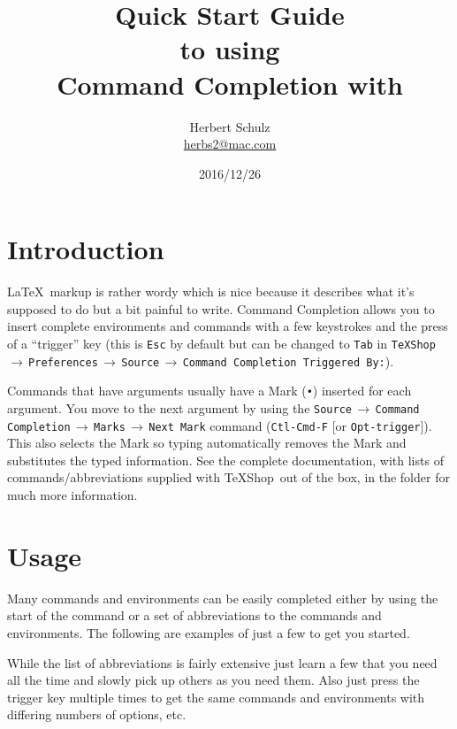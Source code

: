 \documentclass[11pt]{article}
\title{Quick Start Guide\\ to using\\ Command Completion with \TS}
\author{Herbert Schulz\\\small\href{mailto:herbs2@mac.com}{herbs2@mac.com}}
\date{2016/12/26}
\newcommand{\mnu}[1]{\texttt{#1}}
\newcommand{\cmd}[1]{\texttt{#1}}
\newcommand{\To}{\,\(\to\)\,}
\newcommand{\TS}{\textsf{\TeX Shop}}
\begin{document}
\maketitle
\thispagestyle{empty}

\section*{Introduction}


\LaTeX\ markup is rather wordy which is nice because it describes what it's supposed to do but a bit painful to write. Command Completion allows you to insert complete environments and commands with a few keystrokes and the press of a ``trigger'' key (this is \cmd{Esc} by default but can be changed to \cmd{Tab} in \mnu{TeXShop}\To\mnu{Preferences}\To\mnu{Source}\To\mnu{Command Completion Triggered By:}).

Commands that have arguments usually have a Mark (\texttt{•}) inserted for each argument. You move to the next argument by using the \mnu{Source}\To\mnu{Command Completion}\To\mnu{Marks}\To\mnu{Next Mark} command (\cmd{Ctl-Cmd-F} [or \cmd{Opt-trigger}]). This also selects the Mark so typing automatically removes the Mark and substitutes the typed information. See the complete documentation, with lists of commands/abbreviations supplied with \TS\ out of the box, in the  folder for much more information.

\section*{Usage}

Many commands and environments can be easily completed either by using the start of the command or a set of abbreviations to the commands and environments. The following are examples of just a few to get you started.

While the list of abbreviations is fairly extensive just learn a few that you need all the time and slowly pick up others as you need them. Also just press the trigger key multiple times to get the same commands and environments with differing numbers of options, etc.
\end{document}
